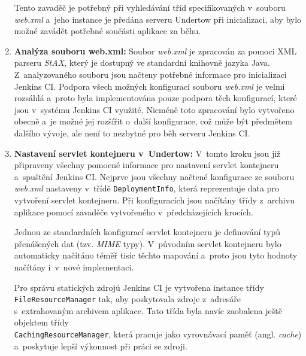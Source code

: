 \begin{enumerate}
                    Tento zavaděč je potřebný
                    při vyhledávání tříd specifikovaných v~souboru \emph{web.xml} a~jeho instance
                    je předána serveru Undertow při inicializaci, aby bylo možné zavádět
                    potřebné součásti aplikace za běhu.

                \item \textbf{Analýza souboru web.xml:} Soubor \emph{web.xml} je 
                    zpracován za pomoci XML parseru \emph{StAX}, který je  dostupný ve standardní knihovně
                    jazyka Java. Z~analyzovaného souboru jsou načteny potřebné informace pro inicializaci
                    Jenkins CI. Podpora všech možných konfigurací souboru \emph{web.xml} je velmi rozsáhlá
                    a~proto byla implementována pouze podpora těch konfigurací, které jsou
                    v~systému Jenkins CI využité. Nicméně toto zpracování bylo vytvořeno obecně 
                    a~je možné jej rozšířit o~další konfigurace, což může být předmětem dalšího vývoje,
                    ale není to nezbytné pro běh serveru Jenkins CI.
                
                \item \textbf{Nastavení servlet kontejneru v~Undertow:} V~tomto kroku
                    jsou již připraveny všechny pomocné informace pro nastavení servlet kontejneru
                    a~spuštění Jenkins CI. Nejprve jsou všechny načtené konfigurace ze souboru \emph{web.xml}
                    nastaveny v~třídě \texttt{DeploymentInfo}, která reprezentuje data pro vytvoření servlet
                    kontejneru. Při konfiguracích jsou načítány třídy z~archivu aplikace pomocí zavaděče vytvořeného
                    v~předcházejících krocích.

                    Jednou ze standardních konfigurací servlet kontejneru je definování typů přenášených dat (tzv.
                    \emph{MIME} typy). V~původním servlet kontejneru bylo automaticky načítáno téměř tisíc těchto mapování
                    a~proto jsou tyto hodnoty načítány i~v~nové implementaci.
                    
                    Pro správu statických zdrojů Jenkins CI je vytvořena instance třídy \\\texttt{FileResourceManager}
                    tak, aby poskytovala zdroje z~adresáře s~extrahovaným archivem aplikace. Tato třída
                    byla navíc zaobalena ještě objektem třídy \\\texttt{CachingResourceManager}, která
                    pracuje jako vyrovnávací paměť (angl. \emph{cache}) a~poskytuje lepší výkonnost
                    při práci se zdroji.



\end{enumerate}
